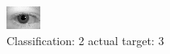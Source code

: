 \begin{figure}[h!]
\begin{center}
\includegraphics[width=0.60\columnwidth]{figures/ID571_class_2_target_3.png}
\end{center}
\caption{ Classification: 2 actual target: 3}
\label{fig:ID571_class_2_target_3}
\end{figure}
